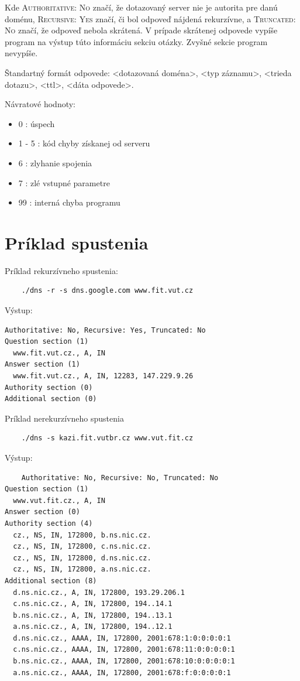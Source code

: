 Kde \textsc{Authoritative: No} značí, že dotazovaný server nie je autorita pre danú doménu, \textsc{Recursive: Yes} značí, či bol odpoveď nájdená rekurzívne,
a \textsc{Truncated: No} značí, že odpoveď nebola skrátená. V prípade skrátenej odpovede vypíše program na výstup túto informáciu sekciu otázky. Zvyšné sekcie program nevypíše.

\noindent Štandartný formát odpovede: <dotazovaná doména>, <typ záznamu>, <trieda dotazu>, <ttl>, <dáta odpovede>. 

Návratové hodnoty:
\begin{itemize}
    \item 0 : úspech
    \item 1 - 5 : kód chyby získanej od serveru
    \item 6 : zlyhanie spojenia
    \item 7 : zlé vstupné parametre
    \item 99 : interná chyba programu
\end{itemize}


\section{Príklad spustenia}
\label{Príklad spustenia}

Príklad rekurzívneho spustenia:

\begin{verbatim}
    ./dns -r -s dns.google.com www.fit.vut.cz  
\end{verbatim}

\noindent Výstup:

\begin{verbatim}
Authoritative: No, Recursive: Yes, Truncated: No
Question section (1)
  www.fit.vut.cz., A, IN
Answer section (1)
  www.fit.vut.cz., A, IN, 12283, 147.229.9.26
Authority section (0)
Additional section (0)
\end{verbatim}

Príklad nerekurzívneho spustenia

\begin{verbatim}
    ./dns -s kazi.fit.vutbr.cz www.vut.fit.cz
\end{verbatim}

\noindent Výstup:
\begin{verbatim}
    Authoritative: No, Recursive: No, Truncated: No
Question section (1)
  www.vut.fit.cz., A, IN
Answer section (0)
Authority section (4)
  cz., NS, IN, 172800, b.ns.nic.cz.
  cz., NS, IN, 172800, c.ns.nic.cz.
  cz., NS, IN, 172800, d.ns.nic.cz.
  cz., NS, IN, 172800, a.ns.nic.cz.
Additional section (8)
  d.ns.nic.cz., A, IN, 172800, 193.29.206.1
  c.ns.nic.cz., A, IN, 172800, 194..14.1
  b.ns.nic.cz., A, IN, 172800, 194..13.1
  a.ns.nic.cz., A, IN, 172800, 194..12.1
  d.ns.nic.cz., AAAA, IN, 172800, 2001:678:1:0:0:0:0:1
  c.ns.nic.cz., AAAA, IN, 172800, 2001:678:11:0:0:0:0:1
  b.ns.nic.cz., AAAA, IN, 172800, 2001:678:10:0:0:0:0:1
  a.ns.nic.cz., AAAA, IN, 172800, 2001:678:f:0:0:0:0:1
\end{verbatim}


